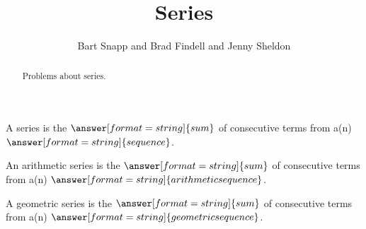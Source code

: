 \documentclass[nooutcomes]{ximera}
\title{Series}
\author{Bart Snapp and Brad Findell and Jenny Sheldon}
\begin{document}
\begin{abstract}
Problems about series.
\end{abstract}
\maketitle



\begin{problem}
A series is the $\answer[format=string]{sum}$ of consecutive terms from a(n) $\answer[format=string]{sequence}$.  

An arithmetic series is the $\answer[format=string]{sum}$ of consecutive terms from a(n) $\answer[format=string]{arithmetic sequence}$.  

A geometric series is the $\answer[format=string]{sum}$ of consecutive terms from a(n) $\answer[format=string]{geometric sequence}$.  
\end{problem}
\end{document}
